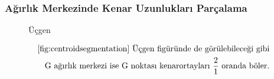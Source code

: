 \subsubsection{Ağırlık Merkezinde Kenar Uzunlukları Parçalama}
\begin{figure}[h!]
    \centering
    \caption{Üçgen}
    \label{fig:centroidsegmentation}
\end{figure}

\begin{equation}
    \begin{aligned}
        \text{\ref{fig:centroidsegmentation} Üçgen figüründe de görülebileceği gibi} \\
        \text{G ağırlık merkezi ise G noktası kenarortayları } \frac{2}{1} \text{ oranda böler.}
    \end{aligned}
\end{equation}